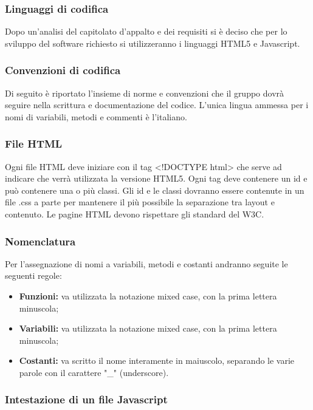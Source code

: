 \subsubsection{Linguaggi di codifica}
Dopo un'analisi del capitolato d'appalto e dei requisiti si è deciso che per lo sviluppo del software richiesto si utilizzeranno i linguaggi HTML5 e Javascript.

\subsubsection{Convenzioni di codifica}
Di seguito è riportato l'insieme di norme e convenzioni che il gruppo dovrà seguire nella scrittura e documentazione del codice.
L'unica lingua ammessa per i nomi di variabili, metodi e commenti è l'italiano.

\subsubsection{File HTML}

Ogni file HTML deve iniziare con il tag <!DOCTYPE html> che serve ad indicare che verrà utilizzata la versione HTML5.
Ogni tag deve contenere un id e può contenere una o più classi.
Gli id e le classi dovranno essere contenute in un file .css a parte per mantenere il più possibile la separazione tra layout e contenuto.
Le pagine HTML devono rispettare gli standard del W3C.

\subsubsection{Nomenclatura}
Per l'assegnazione di nomi a variabili, metodi e costanti andranno seguite le seguenti regole:
\begin{itemize}
	\item \textbf{Funzioni:} va utilizzata la notazione mixed case, con la prima lettera minuscola;
	\item \textbf{Variabili:} va utilizzata la notazione mixed case, con la prima lettera minuscola;
	\item \textbf{Costanti:} va scritto il nome interamente in maiuscolo, separando le varie parole con il carattere "\_" (underscore).
\end{itemize}

\subsubsection{Intestazione di un file Javascript}


